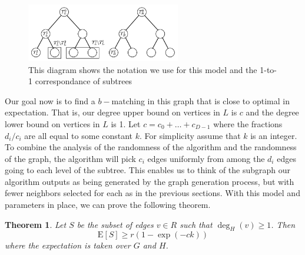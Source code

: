\documentclass[]{article}
\newcommand{\E}{\text{E}}
\newtheorem{thm}{Theorem}
\begin{document}
\begin{figure}[h]
\centering
\includegraphics[width=0.6\textwidth]{hierarchy_tree.png}
\begin{minipage}[h]{0.7\textwidth}
\caption{This diagram shows the notation we use for this model and the 1-to-1 correspondance of subtrees}
\end{minipage}
\end{figure}

Our goal now is to find a $b-$matching in this graph that is close to
optimal in expectation. That is, our degree upper bound on vertices in
$L$ is $c$ and the degree lower bound on vertices in $L$ is 1. Let $c
= c_0 + \ldots + c_{D-1}$ where the fractions $d_{i}/c_{i}$ are all
equal to some constant $k$. For simplicity assume that $k$ is an
integer. To combine the analysis of the randomness of the algorithm
and the randomness of the graph, the algorithm will pick $c_{i}$ edges
uniformly from among the $d_{i}$ edges going to each level of the
subtree. This enables us to think of the subgraph our algorithm
outputs as being generated by the graph generation process, but with
fewer neighbors selected for each as in the previous sections. With
this model and parameters in place, we can prove the following
theorem.\

\begin{thm}
Let $S$ be the subset of edges $v\in R$ such that $\deg_H(v) \geq 1$. Then
\[ \E[S] \geq r(1-\exp(-ck)) \]
where the expectation is taken over $G$ and $H$.
\end{thm}
\end{document}
